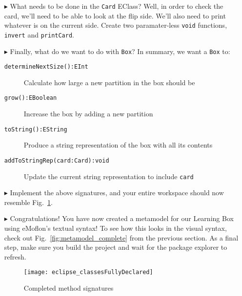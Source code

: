 \begin{itemize}
\vspace{0.5cm}

\item[$\blacktriangleright$] What needs to be done in the \texttt{Card} EClass? Well, in order to check the card, we'll need to be able to look at the flip
side. We'll also need to print whatever is on the current side. Create two paramater-less \texttt{void} functions, \texttt{invert} and \texttt{printCard}. 

\item[$\blacktriangleright$] Finally, what do we want to do with \texttt{Box}? In summary, we want a \texttt{Box} to:

\begin{description}
  \item[\texttt{determineNextSize():EInt}] Calculate how large a new partition in the box should be
  \item[\texttt{grow():EBoolean}] Increase the box by adding a new partition
  \item[\texttt{toString():EString}] Produce a string representation of the box with all its contents
  \item[\texttt{addToStringRep(card:Card):void}] Update the current string representation to include \texttt{card}
\end{description}

\item[$\blacktriangleright$] Implement the above signatures, and your entire workspace should now resemble Fig.~\ref{fig:workspaceMethods}.

\item[$\blacktriangleright$] Congratulations! You have now created a metamodel for our Learning Box using eMoflon's textual syntax! To see how
this looks in the visual syntax, check out Fig.~\ref{fig:metamodel_complete} from the previous section. As a final step, make sure you build the project and
wait for the package explorer to refresh. 

\newpage


\begin{figure}[htbp]
	\centering
  \texttt{[image: eclipse\_classesFullyDeclared]}
	\caption{Completed method signatures}
	\label{fig:workspaceMethods}
\end{figure}
\FloatBarrier

\end{itemize}